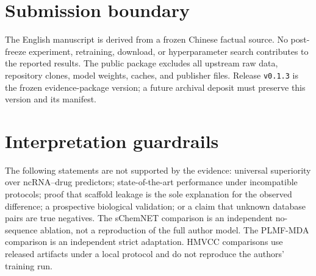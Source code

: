 \documentclass[10pt]{article}
\begin{document}



\appendix
\section{Submission boundary}

The English manuscript is derived from a frozen Chinese factual source. No post-freeze experiment, retraining, download, or hyperparameter search contributes to the reported results. The public package excludes all upstream raw data, repository clones, model weights, caches, and publisher files. Release \texttt{v0.1.3} is the frozen evidence-package version; a future archival deposit must preserve this version and its manifest.

\section{Interpretation guardrails}

The following statements are not supported by the evidence: universal superiority over ncRNA--drug predictors; state-of-the-art performance under incompatible protocols; proof that scaffold leakage is the sole explanation for the observed difference; a prospective biological validation; or a claim that unknown database pairs are true negatives. The sChemNET comparison is an independent no-sequence ablation, not a reproduction of the full author model. The PLMF-MDA comparison is an independent strict adaptation. HMVCC comparisons use released artifacts under a local protocol and do not reproduce the authors' training run.
\end{document}
